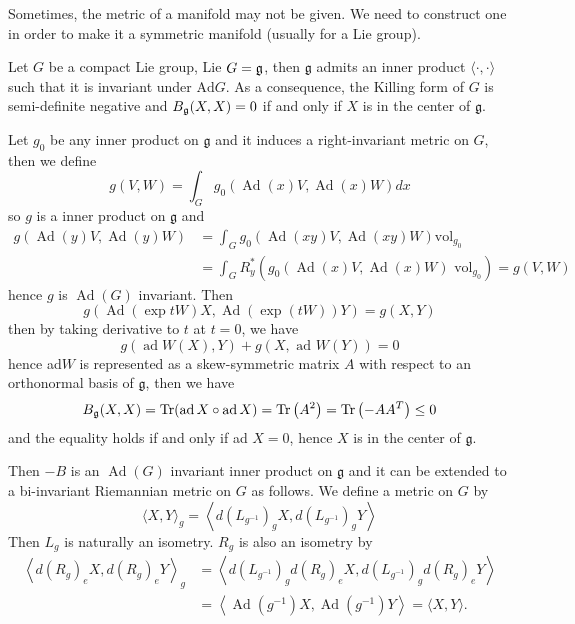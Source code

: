 Sometimes, the metric of a manifold may not be given. We need to
construct one in order to make it a symmetric manifold (usually
for a Lie group).

\begin{lemma}
Let $G$ be a compact Lie group, Lie $G = {\mathfrak g}$, then
$\mathfrak{g}$ admits an inner product $\langle\cdot,
\cdot\rangle$ such that it is invariant under $\mathrm{Ad} {G}$.
As a consequence, the
Killing form of $G$ is semi-definite negative and $B_{{\mathfrak g}}(X, X)
= 0$ if and only if $X$ is in the center of $\mathfrak{g}$.	
\end{lemma}
\bproof
Let $g_{0}$ be any inner product on $\mathfrak{g}$ and it induces
a right-invariant metric on
$G$, then we define
\[
g(V, W) = \int_{G} g_{0}(\operatorname{Ad}(x) V,
\operatorname{Ad}(x) W) d x
\]
so $g$ is a inner product on $\mathfrak{g}$ and
\[
\begin{aligned}
	g(\operatorname{Ad}(y) V, \operatorname{Ad}(y) W) & =
	\int_{G} g_{0}(\operatorname{Ad}(x y) V, \operatorname{Ad}(x
	y) W)\mathrm{vol}_{g_{0}} \\
	& = \int_G R_{y}^{*}\left( g_{0}(\operatorname{Ad}(x) V,
	\operatorname{Ad}(x) W) \text { vol}_{g_{0}} \right) = g(V,
	{W})
\end{aligned}
\]
hence $g$ is $\operatorname{Ad}(G)$ invariant. Then
\[
g(\operatorname{Ad}(\exp t W) X, \operatorname{Ad}(\exp (t W)) Y)
= g(X, Y)
\]
then by taking derivative to $t$ at $t=0$, we have
\[
g(\operatorname{ad} W(X), Y)+g(X, \text { ad } W(Y)) = 0
\]
hence ad$W$ is represented as a skew-symmetric matrix $A$ with
respect to an
orthonormal basis of $\mathfrak{g}$, then we have
\[
B_{{\mathfrak g}}(X, X) = \operatorname{Tr}(\operatorname{ad} X \circ
\operatorname{ad} X)=\operatorname{Tr}\left(A^{2}\right) =
\operatorname{Tr}\left(-A A^{T}\right) \leq 0
\]
and the equality holds if and only if ad $X=0$, hence $X$ is in
the center of $\mathfrak{g}$.
\eproof

Then $-B$ is an $\operatorname{Ad}(G)$ invariant inner product on
$\mathfrak{g}$ and it can be extended to a bi-invariant
Riemannian metric on $G$ as follows. We define a metric on $G$ by
\[
\langle X, Y\rangle_{g} = \left\langle
d\left(L_{g^{-1}}\right)_{g} X, d\left( L_{g^{-1}} \right)_{g}
Y\right\rangle
\]
Then $L_{g}$ is naturally an isometry. $R_{g}$ is also an
isometry by 
\[
\begin{aligned}
	\left\langle d\left (R_{g} \right)_{e} X, d\left( R_{g}
	\right)_{e} Y\right\rangle_{g} & = \left\langle d\left(
	L_{g^{-1}} \right)_{g} d\left( R_{g} \right)_{e} X, d\left(
	L_{g^{-1}} \right)_{g} d\left( R_{g} \right)_{e}
	Y\right\rangle \\
	&=\left\langle\operatorname{Ad}\left(g^{-1}\right) X,
	\operatorname{Ad}\left( g^{-1} \right) Y\right\rangle=\langle
	X, Y\rangle.
\end{aligned}
\]


